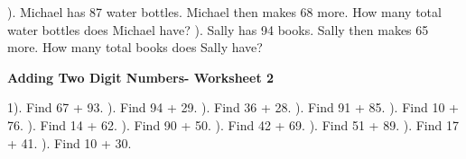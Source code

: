 \documentclass{article}%
\begin{document}
\newline%
\newline%
). Michael has 87 water bottles. Michael then makes 68 more. How many total water bottles does Michael have?%
\newline%
\newline%
). Sally has 94 books. Sally then makes 65 more. How many total books does Sally have?%
\newline%
\newline%
\newline%
\pagebreak%
\large%
\begin{center}%
\textbf{Adding Two Digit Numbers- Worksheet 2}%
\newline%
\end{center} \normalsize%
1). Find 67 + 93.%
\newline%
\newline%
). Find 94 + 29.%
\newline%
\newline%
). Find 36 + 28.%
\newline%
\newline%
). Find 91 + 85.%
\newline%
\newline%
). Find 10 + 76.%
\newline%
\newline%
). Find 14 + 62.%
\newline%
\newline%
). Find 90 + 50.%
\newline%
\newline%
). Find 42 + 69.%
\newline%
\newline%
). Find 51 + 89.%
\newline%
\newline%
). Find 17 + 41.%
\newline%
\newline%
). Find 10 + 30.%
\end{document}
